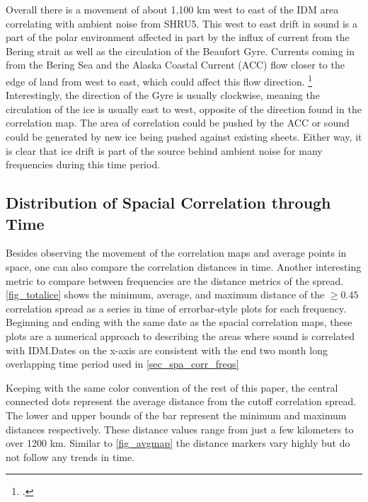 Overall there is a movement of about 1,100 km west to east of the IDM area correlating with ambient noise from SHRU5. This west to east drift in sound is a part of the polar environment affected in part by the influx of current from the Bering strait as well as the circulation of the Beaufort Gyre. Currents coming in from the Bering Sea and the Alaska Coastal Current (ACC) flow closer to the edge of land from west to east, which could affect this flow direction. \footcite[]{Weingartner2005} Interestingly, the direction of the Gyre is usually clockwise, meaning the circulation of the ice is usually east to west, opposite of the direction found in the correlation map. The area of correlation could be pushed by the ACC or sound could be generated by new ice being pushed against existing sheets. Either way, it is clear that ice drift is part of the source behind ambient noise for many frequencies during this time period. 




\subsection{Distribution of Spacial Correlation through Time}

Besides observing the movement of the correlation maps and average points in space, one can also compare the correlation distances in time. Another interesting metric to compare between frequencies are the distance metrics of the spread. \autoref{fig_totalice} shows the minimum, average, and maximum distance of the $\geq 0.45$ correlation spread as a series in time of errorbar-style plots for each frequency. Beginning and ending with the same date as the spacial correlation maps, these plots are a numerical approach to describing the areas where sound is correlated with IDM.Dates on the x-axis are consistent with the end two month long overlapping time period used in \autoref{sec_spa_corr_freqs}

Keeping with the same color convention of the rest of this paper, the central connected dots represent the average distance from the cutoff correlation spread. The lower and upper bounds of the bar represent the minimum and maximum distances respectively. These distance values range from just a few kilometers to over 1200 km. Similar to \autoref{fig_avgmap} the distance markers vary highly but do not follow any trends in time. 


